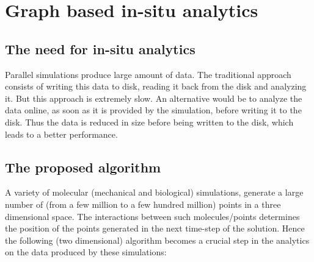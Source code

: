
\chapter{Graph based in-situ analytics} %

\label{Chapter6} %


\section{The need for in-situ analytics}
Parallel simulations produce large amount of data. The traditional approach consists of writing this data to disk, reading it back from the disk and analyzing it. But this approach is extremely slow. An alternative would be to analyze the data online, as soon as it is provided by the simulation, before writing it to the disk. Thus the data is reduced in size before being written to the disk, which leads to a better performance.

\section{The proposed algorithm}    %
A variety of molecular (mechanical and biological) simulations, generate a large number of (from a few million to a few hundred million) points in a three dimensional space. The interactions between such molecules/points determines the position of the points generated in the next time-step of the solution. Hence the following (two dimensional) algorithm becomes a crucial step in the analytics on the data produced by these simulations:


